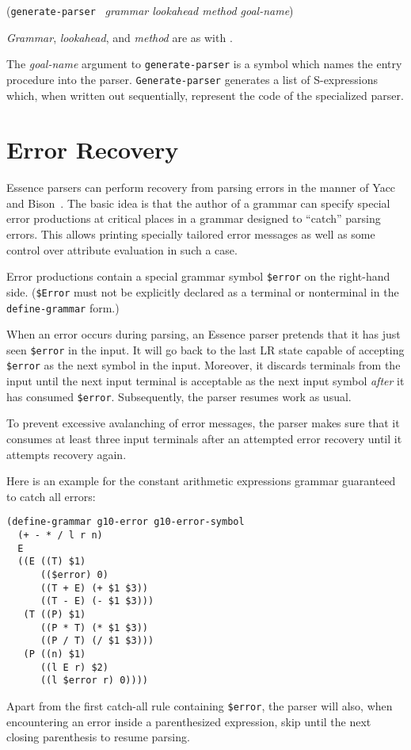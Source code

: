\documentclass{article}
\renewcommand{\var}[1]{\noindent\mbox{\textit{#1}}}
\newcommand{\ide}[1]{{\frenchspacing\textnormal{\texttt{#1}}}}
\newcommand{\pproto}[2]{\unskip%
\mbox{\texonly{\spaceskip=0.5em}#1}%
\mbox{ }\texonly{\nobreak}\htmlonly{ }\textrm{#2}}
\newcommand{\proto}[3]{\par\bigskip\begin{flushleft}\pproto{(\texttt{#1}}{\textit{#2})}\hspace*{\fill}{#3}\end{flushleft}}
\newcommand{\codefont}[1]{\texttt{#1}}
\begin{document}
\proto{generate-parser}{grammar lookahead method goal-name}{procedure}
%
\var{Grammar}, \var{lookahead}, and \var{method} are as with
\link{\codefont{parse}}{proc:parse}.

The \var{goal-name} argument to \ide{generate-parser} is a symbol
which names the entry procedure into the parser.
\ide{Generate-parser} generates a list of S-expressions which, when
written out sequentially, represent the code of the specialized
parser.

\section{Error Recovery}
\label{sec:error-recovery}

Essence parsers can perform recovery from parsing errors in the manner
of Yacc~\cite{Johnson1975} and Bison~\cite{DonnellyStallman1995}.  The
basic idea is that the author of a grammar can specify special
error productions at critical places in a grammar designed to ``catch''
parsing errors.  This allows printing specially tailored error
messages as well as some control over attribute evaluation in such a
case.

Error productions contain a special grammar symbol \codefont{\$error}
on the right-hand side.  (\codefont{\$Error} must not be explicitly
declared as a terminal or nonterminal in the \codefont{define-grammar}
form.)

When an error occurs during parsing, an Essence parser pretends that
it has just seen \codefont{\$error} in the input.  It will go back to
the last LR state capable of accepting \codefont{\$error} as the next
symbol in the input.  Moreover, it discards terminals from the input
until the next input terminal is acceptable as the next input symbol
\emph{after} it has consumed \codefont{\$error}.  Subsequently, the
parser resumes work as usual.

To prevent excessive avalanching of error messages, the parser makes
sure that it consumes at least three input terminals after an
attempted error recovery until it attempts recovery again.

Here is an example for the constant arithmetic expressions grammar
guaranteed to catch all errors:
%
\begin{verbatim}
(define-grammar g10-error g10-error-symbol
  (+ - * / l r n)
  E
  ((E ((T) $1)
      (($error) 0)
      ((T + E) (+ $1 $3))
      ((T - E) (- $1 $3)))
   (T ((P) $1)
      ((P * T) (* $1 $3))
      ((P / T) (/ $1 $3)))
   (P ((n) $1)
      ((l E r) $2)
      ((l $error r) 0))))
\end{verbatim}
%
Apart from the first catch-all rule containing \codefont{\$error}, the
parser will also, when encountering an error inside a parenthesized
expression, skip until the next closing parenthesis to resume parsing.
\end{document}
